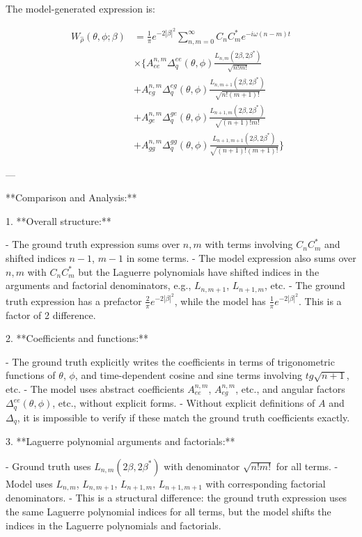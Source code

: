 \documentclass[10pt]{article}
\begin{document}
The model-generated expression is:

\[
\begin{aligned}
W_{\hat\rho}(\theta,\phi;\beta)
&= \frac{1}{\pi} e^{-2|\beta|^2} \sum_{n,m=0}^\infty C_n C_m^* e^{-i\omega(n - m)t} \\
& \times \Biggl\{
A_{ee}^{n,m} \Delta_q^{ee}(\theta,\phi) \frac{L_{n,m}(2\beta,2\beta^*)}{\sqrt{n! m!}} \\
& + A_{eg}^{n,m} \Delta_q^{eg}(\theta,\phi) \frac{L_{n,m+1}(2\beta,2\beta^*)}{\sqrt{n! (m+1)!}} \\
& + A_{ge}^{n,m} \Delta_q^{ge}(\theta,\phi) \frac{L_{n+1,m}(2\beta,2\beta^*)}{\sqrt{(n+1)! m!}} \\
& + A_{gg}^{n,m} \Delta_q^{gg}(\theta,\phi) \frac{L_{n+1,m+1}(2\beta,2\beta^*)}{\sqrt{(n+1)! (m+1)!}}
\Biggr\}
\end{aligned}
\]

---

**Comparison and Analysis:**

1. **Overall structure:**

- The ground truth expression sums over $n,m$ with terms involving $C_n C_m^*$ and shifted indices $n-1$, $m-1$ in some terms.
- The model expression also sums over $n,m$ with $C_n C_m^*$ but the Laguerre polynomials have shifted indices in the arguments and factorial denominators, e.g., $L_{n,m+1}$, $L_{n+1,m}$, etc.
- The ground truth expression has a prefactor $\frac{2}{\pi} e^{-2|\beta|^2}$, while the model has $\frac{1}{\pi} e^{-2|\beta|^2}$. This is a factor of 2 difference.

2. **Coefficients and functions:**

- The ground truth explicitly writes the coefficients in terms of trigonometric functions of $\theta$, $\phi$, and time-dependent cosine and sine terms involving $tg\sqrt{n+1}$, etc.
- The model uses abstract coefficients $A_{ee}^{n,m}$, $A_{eg}^{n,m}$, etc., and angular factors $\Delta_q^{ee}(\theta,\phi)$, etc., without explicit forms.
- Without explicit definitions of $A$ and $\Delta_q$, it is impossible to verify if these match the ground truth coefficients exactly.

3. **Laguerre polynomial arguments and factorials:**

- Ground truth uses $L_{n,m}(2\beta, 2\beta^*)$ with denominator $\sqrt{n! m!}$ for all terms.
- Model uses $L_{n,m}$, $L_{n,m+1}$, $L_{n+1,m}$, $L_{n+1,m+1}$ with corresponding factorial denominators.
- This is a structural difference: the ground truth expression uses the same Laguerre polynomial indices for all terms, but the model shifts the indices in the Laguerre polynomials and factorials.
\end{document}
